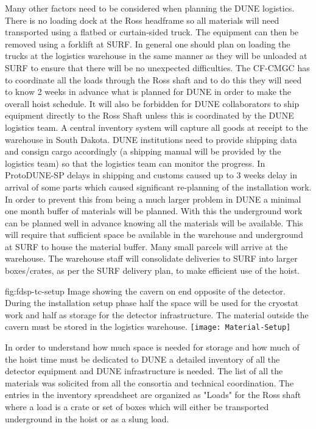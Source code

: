 Many other factors need to be considered when planning the DUNE logistics. There is no loading dock at the Ross headframe so all materials will need transported using a flatbed or curtain-sided truck. The equipment can then be removed using a forklift at SURF. In general one should plan on loading the trucks at the logistics warehouse in the same manner as they will be unloaded at SURF to ensure that there will be no unexpected difficulties. The CF-CMGC has to coordinate all the loads through the Ross shaft and to do this they will need to know 2 weeks in advance what is planned for DUNE in order to make the overall hoist schedule. It will also be forbidden for DUNE collaborators to ship equipment directly to the Ross Shaft unless this is coordinated by the DUNE logistics team. A central inventory system will capture all goods at receipt to the warehouse in South Dakota. DUNE institutions need to provide shipping data and consign cargo accordingly (a shipping manual will be provided by the logistics team) so that the logistics team can monitor the progress. In ProtoDUNE-SP delays in shipping and customs caused up to 3 weeks delay in arrival of some parts which caused significant re-planning of the installation work. In order to prevent this from being a much larger problem in DUNE a minimal one month buffer of materials will be planned. With this the underground work can be planned well in advance knowing all the materials will be available. This will require that sufficient space be available in the warehouse and underground at SURF to house the material buffer. Many small parcels will arrive at the warehouse. The warehouse staff will consolidate deliveries to SURF into larger boxes/crates, as per the SURF delivery plan, to make efficient use of the hoist. 


\begin{dunefigure}{fig:fdsp-tc-setup}
  {Image showing the cavern on end opposite of the detector. During the installation setup phase half the space will be used for the cryostat work and half as storage for the detector infrastructure. The material outside the cavern must be stored in the logistics warehouse.}
\texttt{[image: Material-Setup]}
\end{dunefigure}
%

In order to understand how much space is needed for storage and how much of the hoist time must be dedicated to DUNE a detailed inventory of all the detector equipment and DUNE infrastructure is needed. The list of all the materials was solicited from all the consortia and technical coordination. The entries in the inventory spreadsheet are organized as "Loads" for the Ross shaft where a load is a crate or set of boxes which will either be transported underground in the hoist or as a slung load.\cite{bib:docdb8426}

